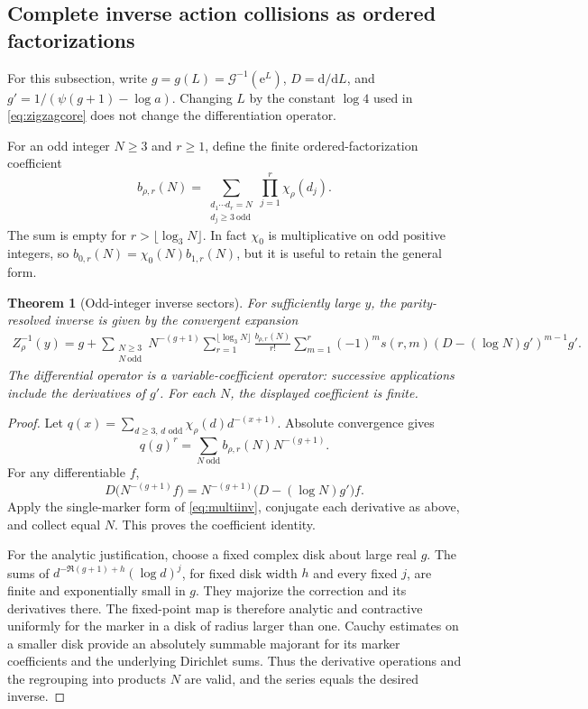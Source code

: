 \documentclass[11pt,a4paper]{article}
\newtheorem{theorem}{Theorem}[section]
\theoremstyle{definition}
\theoremstyle{remark}
\newcommand{\dd}{\mathrm d}
\newcommand{\ee}{\mathrm e}
\numberwithin{equation}{section}
\begin{document}
\subsection{Complete inverse action collisions as ordered factorizations}
For this subsection, write $g=g(L)=\mathcal G^{-1}(\ee^L)$, $D=\dd/\dd L$, and $g'=1/(\psi(g+1)-\log a)$. Changing $L$ by the constant $\log4$ used in \eqref{eq:zigzagcore} does not change the differentiation operator.

For an odd integer $N\ge3$ and $r\ge1$, define the finite ordered-factorization coefficient
\begin{equation}
 b_{\rho,r}(N)=
 \sum_{\substack{d_1\cdots d_r=N\\d_j\ge3\ \mathrm{odd}}}
 \prod_{j=1}^r\chi_\rho(d_j).
 \label{eq:orderedfactor}
\end{equation}
The sum is empty for $r>\lfloor\log_3N\rfloor$. In fact $\chi_0$ is multiplicative on odd positive integers, so $b_{0,r}(N)=\chi_0(N)b_{1,r}(N)$, but it is useful to retain the general form.

\begin{theorem}[Odd-integer inverse sectors]
For sufficiently large $y$, the parity-resolved inverse is given by the convergent expansion
\begin{align}
 Z_\rho^{-1}(y)=g+\sum_{\substack{N\ge3\\N\ \mathrm{odd}}}N^{-(g+1)}
 \sum_{r=1}^{\lfloor\log_3N\rfloor}\frac{b_{\rho,r}(N)}{r!}
 \sum_{m=1}^r(-1)^m s(r,m)
 \left(D-(\log N)g'\right)^{m-1}g'.
 \label{eq:zigzaginverse}
\end{align}
The differential operator is a variable-coefficient operator: successive applications include the derivatives of $g'$. For each $N$, the displayed coefficient is finite.
\end{theorem}
\begin{proof}
Let $q(x)=\sum_{d\ge3,\,d\text{ odd}}\chi_\rho(d)d^{-(x+1)}$. Absolute convergence gives
\[
 q(g)^r=\sum_{N\ \mathrm{odd}}b_{\rho,r}(N)N^{-(g+1)}.
\]
For any differentiable $f$,
\[
 D\bigl(N^{-(g+1)}f\bigr)
 =N^{-(g+1)}\bigl(D-(\log N)g'\bigr)f.
\]
Apply the single-marker form of \eqref{eq:multiinv}, conjugate each derivative as above, and collect equal $N$. This proves the coefficient identity.

For the analytic justification, choose a fixed complex disk about large real $g$. The sums of $d^{-\Re(g+1)+h}(\log d)^j$, for fixed disk width $h$ and every fixed $j$, are finite and exponentially small in $g$. They majorize the correction and its derivatives there. The fixed-point map is therefore analytic and contractive uniformly for the marker in a disk of radius larger than one. Cauchy estimates on a smaller disk provide an absolutely summable majorant for its marker coefficients and the underlying Dirichlet sums. Thus the derivative operations and the regrouping into products $N$ are valid, and the series equals the desired inverse.
\end{proof}
\end{document}
